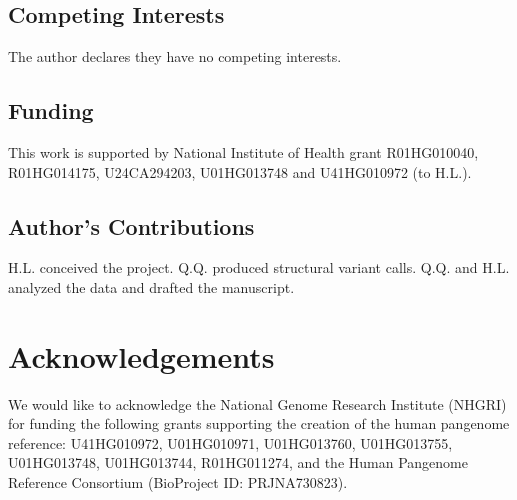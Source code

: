 \documentclass[a4paper,num-refs]{oup-contemporary}
\begin{document}
\subsection{Competing Interests}

The author declares they have no competing interests.

\subsection{Funding}

This work is supported by National Institute of Health grant
R01HG010040,
R01HG014175,
U24CA294203,
U01HG013748
and U41HG010972 (to H.L.).

\subsection{Author's Contributions}

H.L. conceived the project.
Q.Q. produced structural variant calls.
Q.Q. and H.L. analyzed the data and drafted the manuscript.

\section{Acknowledgements}

We would like to acknowledge the National Genome Research Institute (NHGRI) for
funding the following grants supporting the creation of the human pangenome
reference: U41HG010972, U01HG010971, U01HG013760, U01HG013755, U01HG013748,
U01HG013744, R01HG011274, and the Human Pangenome Reference Consortium
(BioProject ID: PRJNA730823).


\end{document}
